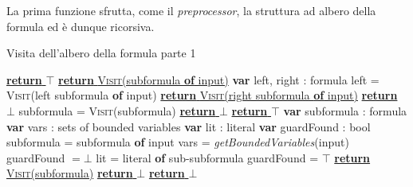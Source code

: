 La prima funzione sfrutta, come il \emph{preprocessor}, 
la struttura ad albero della formula ed è dunque ricorsiva.
\begin{algorithm}[H]
    \caption{Visita dell'albero della formula parte 1}
    \begin{algorithmic}[1]
                    \State \underline{\textbf{return} $\top$}
                \EndSwitch
                \Switch{$\lnot$}
                    \State \underline{\textbf{return} \textsc{Visit}(subformula \textbf{of} input)}
                \EndSwitch
                \Switch{$\rightarrow,\leftrightarrow$}
                    \State \textbf{var} left, right : formula
                    \State left = \textsc{Visit}(left subformula \textbf{of} input)
                        \State \underline{\textbf{return} \textsc{Visit}(right subformula \textbf{of} input)}
                    \EndIf
                    \State \underline{\textbf{return} $\bot$}
                \EndSwitch
                \Switch{$\land,\lor$}
                        \State subformula = \textsc{Visit}(subformula)
                            \State \underline{\textbf{return} $\bot$}
                        \EndIf
                    \EndFor
                    \State \underline{\textbf{return} $\top$} 
                \EndSwitch
                \Switch{$\exists$}
                    \State \textbf{var} subformula : formula
                    \State \textbf{var} vars : sets of bounded variables 
                    \State \textbf{var} lit : literal
                    \State \textbf{var} guardFound : bool
                    \State subformula = subformula \textbf{of} input
                    \State vars = \emph{getBoundedVariables}(input)
                     \label{exists}
                        \State guardFound $=\bot$
                                \State lit = literal \textbf{of} sub-subformula
                                 \label{pos-guard}
                                    \State guardFound = $\top$
                                \EndIf
                            \EndIf
                        \EndWhile
                            \State \underline{\textbf{return} \textsc{Visit}(subformula)} 
                        \Else
                            \State \underline{\textbf{return} $\bot$}
                        \EndIf
                    \Else 
                        \State \underline{\textbf{return} $\bot$}
                    \EndIf
                \EndSwitch
    \end{algorithmic}
\end{algorithm}

